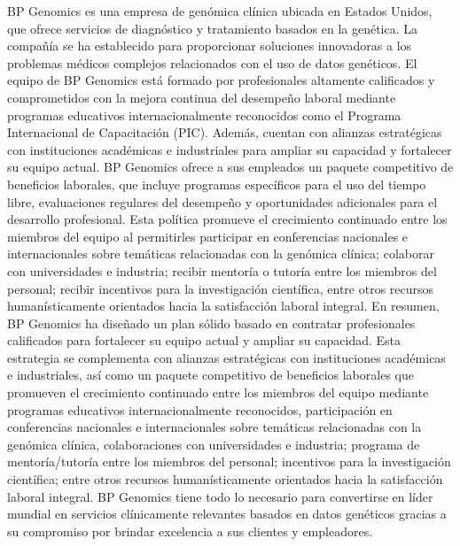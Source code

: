 BP Genomics es una empresa de genómica clínica ubicada en Estados Unidos, que ofrece servicios de diagnóstico y tratamiento basados en la genética. La compañía se ha establecido para proporcionar soluciones innovadoras a los problemas médicos complejos relacionados con el uso de datos genéticos. El equipo de BP Genomics está formado por profesionales altamente calificados y comprometidos con la mejora continua del desempeño laboral mediante programas educativos internacionalmente reconocidos como el Programa Internacional de Capacitación (PIC). Además, cuentan con alianzas estratégicas con instituciones académicas e industriales para ampliar su capacidad y fortalecer su equipo actual.
BP Genomics ofrece a sus empleados un paquete competitivo de beneficios laborales, que incluye programas específicos para el uso del tiempo libre, evaluaciones regulares del desempeño y oportunidades adicionales para el desarrollo profesional. Esta política promueve el crecimiento continuado entre los miembros del equipo al permitirles participar en conferencias nacionales e internacionales sobre temáticas relacionadas con la genómica clínica; colaborar con universidades e industria; recibir mentoría o tutoría entre los miembros del personal; recibir incentivos para la investigación científica, entre otros recursos humanísticamente orientados hacia la satisfacción laboral integral.
En resumen, BP Genomics ha diseñado un plan sólido basado en contratar profesionales calificados para fortalecer su equipo actual y ampliar su capacidad. Esta estrategia se complementa con alianzas estratégicas con instituciones académicas e industriales, así como un paquete competitivo de beneficios laborales que promueven el crecimiento continuado entre los miembros del equipo mediante programas educativos internacionalmente reconocidos, participación en conferencias nacionales e internacionales sobre temáticas relacionadas con la genómica clínica, colaboraciones con universidades e industria; programa de mentoría/tutoría entre los miembros del personal; incentivos para la investigación científica; entre otros recursos humanísticamente orientados hacia la satisfacción laboral integral. BP Genomics tiene todo lo necesario para convertirse en líder mundial en servicios clínicamente relevantes basados ​​en datos genéticos gracias a su compromiso por brindar excelencia a sus clientes y empleadores.
